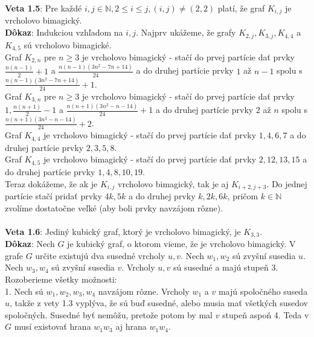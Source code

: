 \documentclass[12pt]{article}
\begin{document}
\textbf{Veta 1.5}: Pre každé  $i,j \in \mathbb{N}, 2 \leq i \leq j, (i, j) \neq (2, 2)$ platí, že graf $K_{i,j}$ je vrcholovo bimagický. \\

\textbf{Dôkaz}: Indukciou vzhľadom na $i,j$. Najprv ukážeme, že grafy $K_{2,j}, K_{3,j}, K_{4,4}$ a $K_{4,5}$ sú vrcholovo bimagické. \\

Graf $K_{2,n}$ pre $n \geq 3$ je vrcholovo bimagický - stačí do prvej partície dať prvky $\frac{n(n-1)}{2} + 1$ a $\frac{n(n-1)(3n^2 - 7n + 14)}{24}$ a do druhej partície prvky $1$ až $n - 1$ spolu s $\frac{n(n-1)(3n^2 - 7n + 14)}{24} + 1$. \\

Graf $K_{3,n}$ pre $n \geq 3$ je vrcholovo bimagický - stačí do prvej partície dať prvky $1, \frac{n(n+1)}{2} - 1$ a $\frac{n(n+1)(3n^2 - n - 14)}{24} + 1$ a do druhej partície prvky $2$ až $n$ spolu s $\frac{n(n+1)(3n^2 - n - 14)}{24} + 2$. \\

Graf $K_{4,4}$ je vrcholovo bimagický - stačí do prvej partície dať prvky $1, 4, 6, 7$ a do druhej partície prvky $2, 3, 5, 8$. \\

Graf $K_{4,5}$ je vrcholovo bimagický - stačí do prvej partície dať prvky $2, 12, 13, 15$ a do druhej partície prvky $1, 4, 8, 10, 19$. \\

Teraz dokážeme, že ak je $K_{i,j}$ vrcholovo bimagický, tak je aj $K_{i+2,j+3}$. Do jednej partície stačí pridať prvky $4k, 5k$ a do druhej prvky $k, 2k, 6k$, pričom $k \in \mathbb{N}$ zvolíme dostatočne veľké (aby boli prvky navzájom rôzne). \\\\ 

\textbf{Veta 1.6}: Jediný kubický graf, ktorý je vrcholovo bimagický, je $K_{3,3}$. \\

\textbf{Dôkaz}: Nech $G$ je kubický graf, o ktorom vieme, že je vrcholovo bimagický. V grafe $G$ určite existujú dva susedné vrcholy $u,v$. Nech $w_1, w_2$ sú zvyšní susedia $u$. Nech $w_3, w_4$ sú zvyšní susedia $v$. Vrcholy $u,v$ sú susedné a majú stupeň 3. Rozoberieme všetky možnosti: \\

1. Nech sú $w_1, w_2, w_3, w_4$ navzájom rôzne. Vrcholy $w_1$ a $v$ majú spoločného suseda $u$, takže z vety 1.3 vyplýva, že sú buď susedné, alebo musia mať všetkých susedov spoločných. Susedné byť nemôžu, pretože potom by mal $v$ stupeň aspoň 4. Teda v $G$ musí existovať hrana $w_1 w_3$ aj hrana $w_1 w_4$. \\
\end{document}
